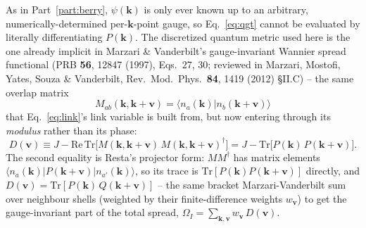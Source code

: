 \documentclass[11pt]{article}
\begin{document}
As in Part~\ref{part:berry}, $\psi(\mathbf k)$ is only ever known up to an arbitrary,
numerically-determined per-$\mathbf k$-point gauge, so Eq.~\eqref{eq:qgt} cannot be
evaluated by literally differentiating $P(\mathbf k)$. The discretized quantum metric
used here is the one already implicit in Marzari \& Vanderbilt's gauge-invariant
Wannier spread functional (PRB \textbf{56}, 12847 (1997), Eqs.~27, 30; reviewed in
Marzari, Mostofi, Yates, Souza \& Vanderbilt, Rev.\ Mod.\ Phys.\ \textbf{84}, 1419
(2012) \S II.C) -- the same overlap matrix
\begin{equation}
  M_{ab}(\mathbf k, \mathbf k+\mathbf v) = \langle n_a(\mathbf k) | n_b(\mathbf
  k+\mathbf v) \rangle
  \label{eq:qg-overlap}
\end{equation}
that Eq.~\eqref{eq:link}'s link variable is built from, but now entering through its
\emph{modulus} rather than its phase:
\begin{equation}
  D(\mathbf v) \equiv J - \mathrm{Re}\,\mathrm{Tr}\bigl[M(\mathbf k,\mathbf k+\mathbf v)\,
    M(\mathbf k,\mathbf k+\mathbf v)^\dagger\bigr]
  = J - \mathrm{Tr}\bigl[P(\mathbf k)\,P(\mathbf k+\mathbf v)\bigr].
  \label{eq:qdist}
\end{equation}
The second equality is Resta's projector form: $M M^\dagger$ has matrix elements
$\langle n_a(\mathbf k)|P(\mathbf k+\mathbf v)|n_{a'}(\mathbf k)\rangle$, so its trace is
$\mathrm{Tr}[P(\mathbf k)P(\mathbf k+\mathbf v)]$ directly, and
$D(\mathbf v) = \mathrm{Tr}[P(\mathbf k)\,Q(\mathbf k+\mathbf v)]$ -- the same bracket
Marzari-Vanderbilt sum over neighbour shells (weighted by their finite-difference
weights $w_{\mathbf v}$) to get the gauge-invariant part of the total spread, $\Omega_I
= \sum_{\mathbf k,\mathbf v} w_{\mathbf v}\, D(\mathbf v)$.
\end{document}
